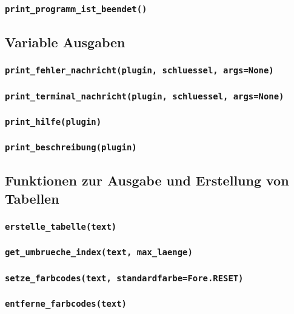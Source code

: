 \documentclass{article}
\begin{document}
\subsubsection*{\texttt{print\_programm\_ist\_beendet()}}


\subsection{Variable Ausgaben}

\subsubsection*{\texttt{print\_fehler\_nachricht(plugin, schluessel, args=None)}}\label{subsubsec:print_fehler_nachricht}

\subsubsection*{\texttt{print\_terminal\_nachricht(plugin, schluessel, args=None)}}\label{subsubsec:print_terminal_nachricht}

\subsubsection*{\texttt{print\_hilfe(plugin)}}

\subsubsection*{\texttt{print\_beschreibung(plugin)}}


\subsection{Funktionen zur Ausgabe und Erstellung von Tabellen}

\subsubsection*{\texttt{erstelle\_tabelle(text)}}\label{subsubsec:erstelle_tabelle}

\subsubsection*{\texttt{get\_umbrueche\_index(text, max_laenge)}}\label{subsubsec:get_umbrueche_index}

\subsubsection*{\texttt{setze\_farbcodes(text, standardfarbe=Fore.RESET)}}\label{subsubsec:setze_farbcodes}

\subsubsection*{\texttt{entferne\_farbcodes(text)}}\label{subsubsec:entferne_farbcodes}
\end{document}
